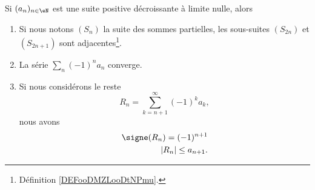 \begin{theorem}      \label{THOooOHANooHYfkII} 
    Si \( (a_n)_{n\in \eN}\) est une suite positive décroissante à limite nulle, alors
    \begin{enumerate}
        \item
            Si nous notons \( (S_n)\) la suite des sommes partielles, les sous-suites \( (S_{2n})\) et \( (S_{2n+1})\) sont adjacentes\footnote{Définition \ref{DEFooDMZLooDtNPmu}.}.
        \item
            La série \( \sum_n(-1)^na_n\) converge.
        \item       \label{ITEMooWEPWooXhLMYL}
            Si nous considérons le reste 
            \begin{equation}
                R_n=\sum_{k=n+1}^{\infty}(-1)^ka_k,
            \end{equation}
            nous avons
            \begin{subequations}
                \begin{align}
                    \signe(R_n)=(-1)^{n+1}\\
                    | R_n |\leq a_{n+1}.
                \end{align}
            \end{subequations}
    \end{enumerate}
\end{theorem}

